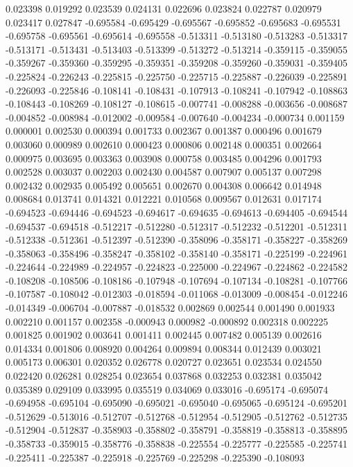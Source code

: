 0.023398
0.019292
0.023539
0.024131
0.022696
0.023824
0.022787
0.020979
0.023417
0.027847
-0.695584
-0.695429
-0.695567
-0.695852
-0.695683
-0.695531
-0.695758
-0.695561
-0.695614
-0.695558
-0.513311
-0.513180
-0.513283
-0.513317
-0.513171
-0.513431
-0.513403
-0.513399
-0.513272
-0.513214
-0.359115
-0.359055
-0.359267
-0.359360
-0.359295
-0.359351
-0.359208
-0.359260
-0.359031
-0.359405
-0.225824
-0.226243
-0.225815
-0.225750
-0.225715
-0.225887
-0.226039
-0.225891
-0.226093
-0.225846
-0.108141
-0.108431
-0.107913
-0.108241
-0.107942
-0.108863
-0.108443
-0.108269
-0.108127
-0.108615
-0.007741
-0.008288
-0.003656
-0.008687
-0.004852
-0.008984
-0.012002
-0.009584
-0.007640
-0.004234
-0.000734
0.001159
0.000001
0.002530
0.000394
0.001733
0.002367
0.001387
0.000496
0.001679
0.003060
0.000989
0.002610
0.000423
0.000806
0.002148
0.000351
0.002664
0.000975
0.003695
0.003363
0.003908
0.000758
0.003485
0.004296
0.001793
0.002528
0.003037
0.002203
0.002430
0.004587
0.007907
0.005137
0.007298
0.002432
0.002935
0.005492
0.005651
0.002670
0.004308
0.006642
0.014948
0.008684
0.013741
0.014321
0.012221
0.010568
0.009567
0.012631
0.017174
-0.694523
-0.694446
-0.694523
-0.694617
-0.694635
-0.694613
-0.694405
-0.694544
-0.694537
-0.694518
-0.512217
-0.512280
-0.512317
-0.512232
-0.512201
-0.512311
-0.512338
-0.512361
-0.512397
-0.512390
-0.358096
-0.358171
-0.358227
-0.358269
-0.358063
-0.358496
-0.358247
-0.358102
-0.358140
-0.358171
-0.225199
-0.224961
-0.224644
-0.224989
-0.224957
-0.224823
-0.225000
-0.224967
-0.224862
-0.224582
-0.108208
-0.108506
-0.108186
-0.107948
-0.107694
-0.107134
-0.108281
-0.107766
-0.107587
-0.108042
-0.012303
-0.018594
-0.011068
-0.013009
-0.008454
-0.012246
-0.014349
-0.006704
-0.007887
-0.018532
0.002869
0.002544
0.001490
0.001933
0.002210
0.001157
0.002358
-0.000943
0.000982
-0.000892
0.002318
0.002225
0.001825
0.001902
0.003641
0.001411
0.002445
0.007482
0.005139
0.002616
0.014334
0.001806
0.008920
0.004264
0.009894
0.008344
0.012439
0.003021
0.005173
0.006301
0.020352
0.026778
0.020727
0.023651
0.023534
0.024550
0.022420
0.026281
0.028254
0.023654
0.037868
0.032253
0.032381
0.035042
0.035389
0.029109
0.033995
0.035519
0.034069
0.033016
-0.695174
-0.695074
-0.694958
-0.695104
-0.695090
-0.695021
-0.695040
-0.695065
-0.695124
-0.695201
-0.512629
-0.513016
-0.512707
-0.512768
-0.512954
-0.512905
-0.512762
-0.512735
-0.512904
-0.512837
-0.358903
-0.358802
-0.358791
-0.358819
-0.358813
-0.358895
-0.358733
-0.359015
-0.358776
-0.358838
-0.225554
-0.225777
-0.225585
-0.225741
-0.225411
-0.225387
-0.225918
-0.225769
-0.225298
-0.225390
-0.108093
